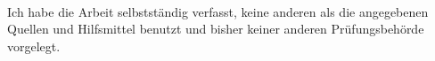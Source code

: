 \documentclass{article}
\theoremstyle{definition}
\begin{document}
%
%
%
%
%
%
%
%
%
%
%


%

%
%




\newpage ~\ \\
Ich habe die Arbeit selbstständig verfasst, keine anderen als die angegebenen Quellen und Hilfsmittel benutzt und bisher keiner anderen Prüfungsbehörde vorgelegt.
\end{document}

